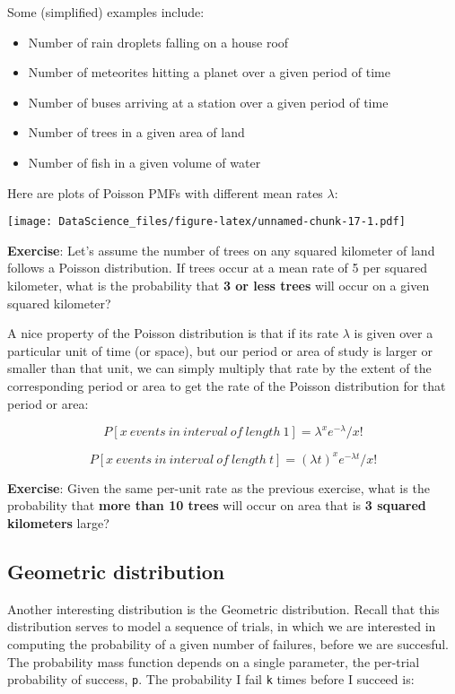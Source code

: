 \documentclass[
]{book}
\begin{document}
Some (simplified) examples include:

\begin{itemize}
\item
  Number of rain droplets falling on a house roof
\item
  Number of meteorites hitting a planet over a given period of time
\item
  Number of buses arriving at a station over a given period of time
\item
  Number of trees in a given area of land
\item
  Number of fish in a given volume of water
\end{itemize}

Here are plots of Poisson PMFs with different mean rates \(\lambda\):

\texttt{[image: DataScience\_files/figure-latex/unnamed-chunk-17-1.pdf]}

\textbf{Exercise}: Let's assume the number of trees on any squared kilometer of land follows a Poisson distribution. If trees occur at a mean rate of 5 per squared kilometer, what is the probability that \textbf{3 or less trees} will occur on a given squared kilometer?

A nice property of the Poisson distribution is that if its rate \(\lambda\) is given over a particular unit of time (or space), but our period or area of study is larger or smaller than that unit, we can simply multiply that rate by the extent of the corresponding period or area to get the rate of the Poisson distribution for that period or area:

\[P[ x\ events\ in\ interval\ of\ length\ 1] =  \lambda^x e^{-\lambda}/x!\]

\[P[ x\ events\ in\ interval\ of\ length\ t] =  (\lambda t)^x e^{-\lambda t}/x!\]

\textbf{Exercise}: Given the same per-unit rate as the previous exercise, what is the probability that \textbf{more than 10 trees} will occur on area that is \textbf{3 squared kilometers} large?

\hypertarget{geometric-distribution}{%
\subsection{Geometric distribution}\label{geometric-distribution}}

Another interesting distribution is the Geometric distribution. Recall that this distribution serves to model a sequence of trials, in which we are interested in computing the probability of a given number of failures, before we are succesful. The probability mass function depends on a single parameter, the per-trial probability of success, \texttt{p}. The probability I fail \texttt{k} times before I succeed is:
\end{document}
